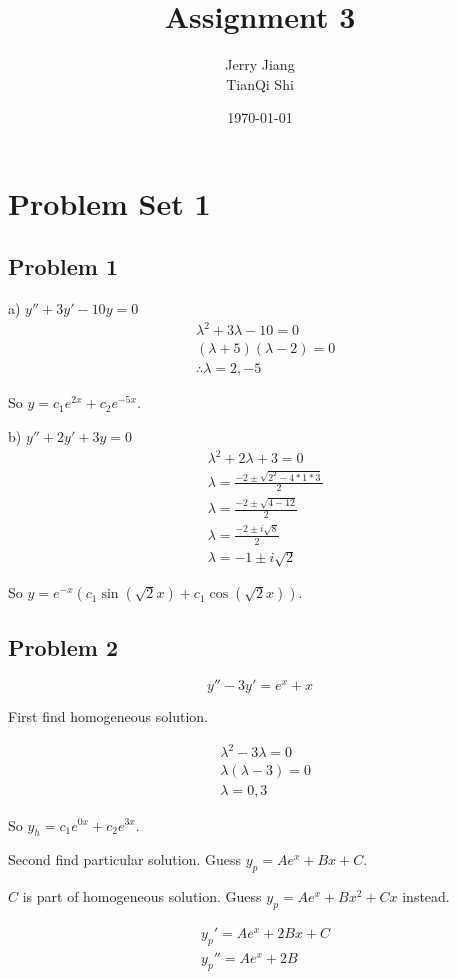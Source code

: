 \documentclass[titlepage]{article}
\title{Assignment 3}
\date{\today}
\author{Jerry Jiang\\ TianQi Shi}
\begin{document}
\maketitle

\noindent
\section{Problem Set 1}
\subsection{Problem 1}
a) $y'' + 3y' - 10y = 0$
\begin{align*}
    &\lambda ^2 + 3 \lambda - 10 = 0
 \\ &(\lambda + 5)(\lambda -  2) = 0
 \\ &\therefore \lambda = 2, -5
\end{align*}

So $y = c_1 e^{2x} + c_2 e^{-5x}$.

b) $y'' + 2y' + 3y = 0$
\begin{align*}
    &\lambda ^2 + 2 \lambda + 3 = 0
 \\ &\lambda = \frac{-2 \pm \sqrt{2^2 - 4 * 1 * 3}}{2}
 \\ &\lambda = \frac{-2 \pm \sqrt{4 - 12}}{2}
 \\ &\lambda = \frac{-2 \pm i\sqrt{8}}{2}
 \\ &\lambda = -1 \pm i\sqrt{2}
\end{align*}

So $y = e^{-x}(c_1 \sin(\sqrt{2}x) + c_1 \cos(\sqrt{2}x))$.

\subsection{Problem 2}
$$y'' - 3y' = e^x + x$$

First find homogeneous solution.

\begin{align*}
    &\lambda^2 - 3\lambda = 0
 \\ &\lambda (\lambda - 3) = 0
 \\ &\lambda = 0, 3
\end{align*}

So $y_h = c_1e^{0x} + c_2e^{3x}$.

Second find particular solution. Guess $y_p = Ae^x + Bx + C$.

$C$ is part of homogeneous solution. Guess $y_p = Ae^x + Bx^2 + Cx$ instead.

\begin{align*}
  &y_p' = Ae^x + 2Bx + C
  \\ &y_p'' = Ae^x + 2B
\end{align*}
\end{document}
